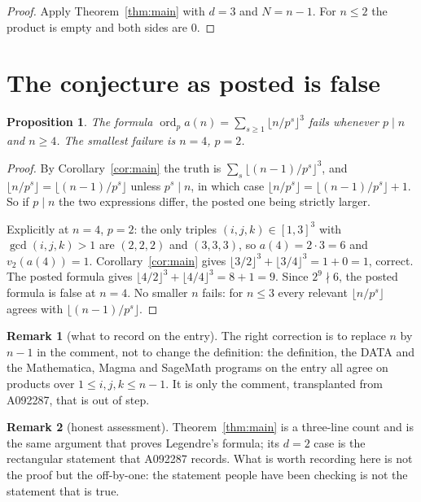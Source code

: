 \documentclass[11pt,a4paper]{article}
\theoremstyle{plain}
\newtheorem{proposition}[theorem]{Proposition}
\theoremstyle{definition}
\newtheorem*{remark}{Remark}
\begin{document}
\begin{proof}
Apply Theorem~\ref{thm:main} with $d=3$ and $N=n-1$. For $n\le2$ the product is empty and
both sides are 0.
\end{proof}

\section{The conjecture as posted is false}

\begin{proposition}\label{prop:false}
The formula $\operatorname{ord}_{p}a(n)=\sum_{s\ge1}\lfloor n/p^{s}\rfloor^{3}$ fails
whenever $p\mid n$ and $n\ge4$. The smallest failure is $n=4$, $p=2$.
\end{proposition}

\begin{proof}
By Corollary~\ref{cor:main} the truth is $\sum_{s}\lfloor(n-1)/p^{s}\rfloor^{3}$, and
$\lfloor n/p^{s}\rfloor=\lfloor(n-1)/p^{s}\rfloor$ unless $p^{s}\mid n$, in which case
$\lfloor n/p^{s}\rfloor=\lfloor(n-1)/p^{s}\rfloor+1$. So if $p\mid n$ the two expressions
differ, the posted one being strictly larger.

Explicitly at $n=4$, $p=2$: the only triples $(i,j,k)\in[1,3]^{3}$ with $\gcd(i,j,k)>1$ are
$(2,2,2)$ and $(3,3,3)$, so $a(4)=2\cdot3=6$ and $v_{2}(a(4))=1$.
Corollary~\ref{cor:main} gives $\lfloor3/2\rfloor^{3}+\lfloor3/4\rfloor^{3}=1+0=1$,
correct. The posted formula gives $\lfloor4/2\rfloor^{3}+\lfloor4/4\rfloor^{3}=8+1=9$.
Since $2^{9}\nmid6$, the posted formula is false at $n=4$. No smaller $n$ fails: for
$n\le3$ every relevant $\lfloor n/p^{s}\rfloor$ agrees with $\lfloor(n-1)/p^{s}\rfloor$.
\end{proof}

\begin{remark}[what to record on the entry]
The right correction is to replace $n$ by $n-1$ in the comment, not to change the
definition: the definition, the DATA and the Mathematica, Magma and SageMath programs on
the entry all agree on products over $1\le i,j,k\le n-1$. It is only the comment,
transplanted from A092287, that is out of step.
\end{remark}

\begin{remark}[honest assessment]
Theorem~\ref{thm:main} is a three-line count and is the same argument that proves
Legendre's formula; its $d=2$ case is the rectangular statement that A092287 records. What
is worth recording here is not the proof but the off-by-one: the statement people have been
checking is not the statement that is true.
\end{remark}
\end{document}
